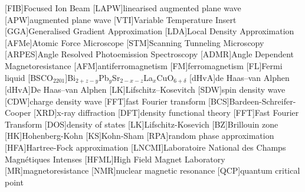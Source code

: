 
[FIB]{Focused Ion Beam}
[LAPW]{linearised augmented plane wave}
[APW]{augmented plane wave}
[VTI]{Variable Temperature Insert}
[GGA]{Generalised Gradient Approximation}
[LDA]{Local Density Approximation}
[AFMe]{Atomic Force Microscope}
[STM]{Scanning Tunneling Microscopy}
[ARPES]{Angle Resolved Photoemission Spectroscopy}
[ADMR]{Angle Dependent Magnetoresistance}
[AFM]{antiferromagnetism}
[FM]{ferromagnetism}
[FL]{Fermi liquid}
[BSCO$_{2201}$]{Bi$_{2+z-y}$Pb$_{y}$Sr$_{2-x-z}$La$_{x}$CuO$_{6+\delta}$}
[dHvA]{de Haas--van Alphen}
[dHvA]{De Haas--van Alphen}
[LK]{Lifschitz--Kosevitch}
[SDW]{spin density wave}
[CDW]{charge density wave}
[FFT]{fast Fourier transform}
[BCS]{Bardeen-Schreifer-Cooper}
[XRD]{x-ray diffraction}
[DFT]{density functional theory}
[FFT]{Fast Fourier Transform}
[DOS]{density of states}
[LK]{Lifschitz-Kosevich}
[BZ]{Brillouin zone}
[HK]{Hohenberg-Kohn}
[KS]{Kohn-Sham}
[RPA]{random phase approximation}
[HFA]{Hartree-Fock approximation}
[LNCMI]{Laboratoire National des Champs Magn\'{e}tiques Intenses} 
[HFML]{High Field Magnet Laboratory}
[MR]{magnetoresistance}
[NMR]{nuclear magnetic resonance}
[QCP]{quantum critical point}


